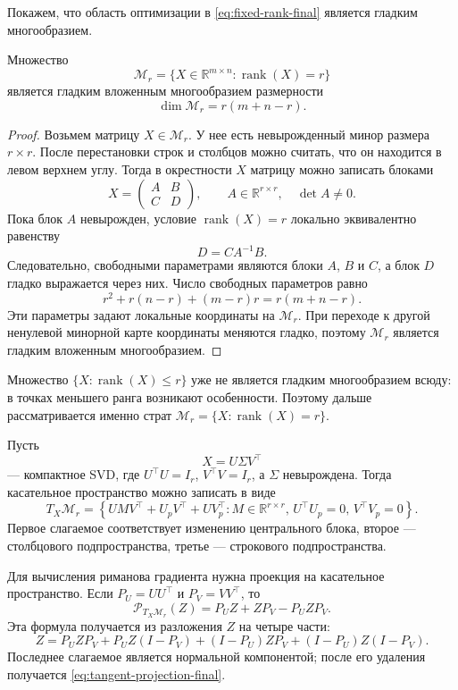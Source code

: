 \documentclass[a4paper,12pt]{article}
\newcommand{\R}{\mathbb{R}}
\newcommand{\rank}{\operatorname{rank}}
\renewcommand{\Proj}{\mathcal{P}}
\newcommand{\Mcal}{\mathcal{M}}
\begin{document}
Покажем, что область оптимизации в \eqref{eq:fixed-rank-final} является гладким многообразием.

\begin{proposition}
Множество
\[
\Mcal_r=\{X\in\R^{m\times n}:\rank(X)=r\}
\]
является гладким вложенным многообразием размерности
\[
\dim \Mcal_r=r(m+n-r).
\]
\end{proposition}

\begin{proof}
Возьмем матрицу $X\in\Mcal_r$. У нее есть невырожденный минор размера $r\times r$. После перестановки строк и столбцов можно считать, что он находится в левом верхнем углу. Тогда в окрестности $X$ матрицу можно записать блоками
\[
X=
\begin{pmatrix}
A & B\\
C & D
\end{pmatrix},
\qquad A\in\R^{r\times r},\quad \det A\ne 0.
\]
Пока блок $A$ невырожден, условие $\rank(X)=r$ локально эквивалентно равенству
\[
D=CA^{-1}B.
\]
Следовательно, свободными параметрами являются блоки $A$, $B$ и $C$, а блок $D$ гладко выражается через них. Число свободных параметров равно
\[
r^2+r(n-r)+(m-r)r=r(m+n-r).
\]
Эти параметры задают локальные координаты на $\Mcal_r$. При переходе к другой ненулевой минорной карте координаты меняются гладко, поэтому $\Mcal_r$ является гладким вложенным многообразием.
\end{proof}

Множество $\{X:\rank(X)\le r\}$ уже не является гладким многообразием всюду: в точках меньшего ранга возникают особенности. Поэтому дальше рассматривается именно страт $\Mcal_r=\{X:\rank(X)=r\}$.

Пусть
\[
X=U\Sigma V^\top
\]
--- компактное SVD, где $U^\top U=I_r$, $V^\top V=I_r$, а $\Sigma$ невырождена. Тогда касательное пространство можно записать в виде
\begin{equation}
\label{eq:tangent-space-final}
T_X\Mcal_r =
\left\{
UMV^\top + U_pV^\top + UV_p^\top :
M \in \R^{r\times r},\,
U^\top U_p = 0,\,
V^\top V_p = 0
\right\}.
\end{equation}
Первое слагаемое соответствует изменению центрального блока, второе --- столбцового подпространства, третье --- строкового подпространства.

Для вычисления риманова градиента нужна проекция на касательное пространство. Если $P_U=UU^\top$ и $P_V=VV^\top$, то
\begin{equation}
\label{eq:tangent-projection-final}
\Proj_{T_X\Mcal_r}(Z)=P_UZ+ZP_V-P_UZP_V.
\end{equation}
Эта формула получается из разложения $Z$ на четыре части:
\[
Z=P_UZP_V+P_UZ(I-P_V)+(I-P_U)ZP_V+(I-P_U)Z(I-P_V).
\]
Последнее слагаемое является нормальной компонентой; после его удаления получается \eqref{eq:tangent-projection-final}.
\end{document}
